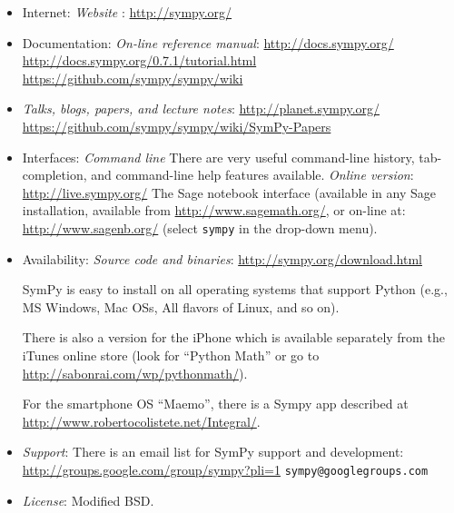 \documentclass[12pt]{article}
\begin{document}
\begin{itemize}
\item
Internet:
\newline
{\it Website} :
\newline
\url{http://sympy.org/}


\item
Documentation:
\newline
{\it On-line reference manual}:
\newline
\url{http://docs.sympy.org/}
\newline
\url{http://docs.sympy.org/0.7.1/tutorial.html}
\newline
\url{https://github.com/sympy/sympy/wiki}

\item
{\it Talks, blogs, papers, and lecture notes}:
\newline
\url{http://planet.sympy.org/}
\newline
\url{https://github.com/sympy/sympy/wiki/SymPy-Papers}

\item
Interfaces:
\newline
{\it Command line}
\newline
There are very useful command-line history, tab-completion, and
command-line help features available.
\newline
{\it Online version}:
\newline
\url{http://live.sympy.org/}
\newline
The Sage notebook interface (available in any Sage installation,
available from \url{http://www.sagemath.org/}, or on-line at:
\url{http://www.sagenb.org/} (select {\tt sympy} in the drop-down menu).
\item
Availability:
\newline
{\it Source code and binaries}:
\url{http://sympy.org/download.html}

SymPy is easy to install on all operating systems that
support Python (e.g., MS Windows, Mac OSs, All flavors of Linux, and
so on).

There is also a version for the iPhone which is available separately
from the iTunes online store (look for ``Python Math'' or
go to \url{http://sabonrai.com/wp/pythonmath/}).

For the smartphone OS ``Maemo'', there is a Sympy app described at
\url{http://www.robertocolistete.net/Integral/}.


\item
{\it Support}:
\newline
There is an email list for SymPy support and development:
\newline
\url{http://groups.google.com/group/sympy?pli=1}
\newline
{\tt sympy@googlegroups.com}


\item
{\it License}:
\newline
Modified BSD.

\end{itemize}
\end{document}
